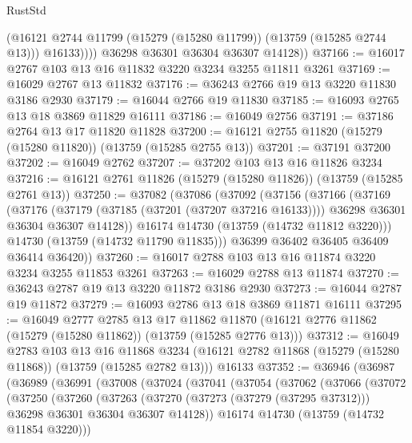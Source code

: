 \begin{lexlean}{RustStd}
\begin{coremodule}
                (@16121 @2744 @11799 (@15279 (@15280 @11799)) (@13759 (@15285 @2744 @13)))
                @16133))))
        @36298
        @36301
        @36304
        @36307
        @14128))
@37166 := @16017 @2767 @103 @13 @16 @11832 @3220 @3234 @3255 @11811 @3261
@37169 := @16029 @2767 @13 @11832
@37176 := @36243 @2766 @19 @13 @3220 @11830 @3186 @2930
@37179 := @16044 @2766 @19 @11830
@37185 := @16093 @2765 @13 @18 @3869 @11829 @16111
@37186 := @16049 @2756
@37191 := @37186 @2764 @13 @17 @11820 @11828
@37200 := @16121 @2755 @11820 (@15279 (@15280 @11820)) (@13759 (@15285 @2755 @13))
@37201 := @37191 @37200
@37202 := @16049 @2762
@37207 := @37202 @103 @13 @16 @11826 @3234
@37216 := @16121 @2761 @11826 (@15279 (@15280 @11826)) (@13759 (@15285 @2761 @13))
@37250 := @37082
    (@37086
      (@37092
        (@37156
          (@37166
            (@37169
              (@37176
                (@37179 (@37185 (@37201 (@37207 @37216 @16133))))
                @36298
                @36301
                @36304
                @36307
                @14128))
            @16174
            @14730
            (@13759 (@14732 @11812 @3220)))
          @14730
          (@13759 (@14732 @11790 @11835)))
        @36399
        @36402
        @36405
        @36409
        @36414
        @36420))
@37260 := @16017 @2788 @103 @13 @16 @11874 @3220 @3234 @3255 @11853 @3261
@37263 := @16029 @2788 @13 @11874
@37270 := @36243 @2787 @19 @13 @3220 @11872 @3186 @2930
@37273 := @16044 @2787 @19 @11872
@37279 := @16093 @2786 @13 @18 @3869 @11871 @16111
@37295 := @16049
    @2777
    @2785
    @13
    @17
    @11862
    @11870
    (@16121 @2776 @11862 (@15279 (@15280 @11862)) (@13759 (@15285 @2776 @13)))
@37312 := @16049
    @2783
    @103
    @13
    @16
    @11868
    @3234
    (@16121 @2782 @11868 (@15279 (@15280 @11868)) (@13759 (@15285 @2782 @13)))
    @16133
@37352 := @36946
    (@36987
      (@36989
        (@36991
          (@37008
            (@37024
              (@37041
                (@37054
                  (@37062
                    (@37066
                      (@37072
                        (@37250
                          (@37260
                            (@37263
                              (@37270
                                (@37273 (@37279 (@37295 @37312)))
                                @36298
                                @36301
                                @36304
                                @36307
                                @14128))
                            @16174
                            @14730
                            (@13759 (@14732 @11854 @3220)))

\end{coremodule}
\end{lexlean}
